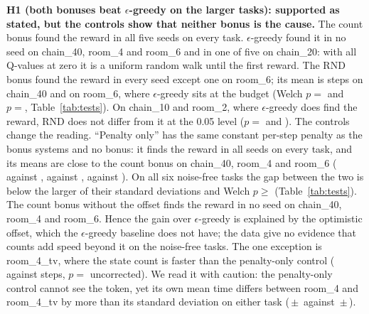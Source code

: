 \textbf{H1 (both bonuses beat $\epsilon$-greedy on the larger tasks): supported as stated, but the controls show that neither bonus is the cause.} The count bonus found the reward in all five seeds on every task. $\epsilon$-greedy found it in no seed on chain\_40, room\_4 and room\_6 and in one of five on chain\_20: with all Q-values at zero it is a uniform random walk until the first reward. The RND bonus found the reward in every seed except one on room\_6; its mean is  steps on chain\_40 and  on room\_6, where $\epsilon$-greedy sits at the budget (Welch $p={}$ and $p={}$, Table~\ref{tab:tests}). On chain\_10 and room\_2, where $\epsilon$-greedy does find the reward, RND does not differ from it at the 0.05 level ($p={}$ and ). The controls change the reading. ``Penalty only'' has the same constant per-step penalty as the bonus systems and no bonus: it finds the reward in all seeds on every task, and its means are close to the count bonus on chain\_40, room\_4 and room\_6 ( against ,  against ,  against ). On all six noise-free tasks the gap between the two is below the larger of their standard deviations and Welch $p\geq{}$ (Table~\ref{tab:tests}). The count bonus without the offset finds the reward in no seed on chain\_40, room\_4 and room\_6. Hence the gain over $\epsilon$-greedy is explained by the optimistic offset, which the $\epsilon$-greedy baseline does not have; the data give no evidence that counts add speed beyond it on the noise-free tasks. The one exception is room\_4\_tv, where the state count is faster than the penalty-only control ( against  steps, $p={}$ uncorrected). We read it with caution: the penalty-only control cannot see the token, yet its own mean time differs between room\_4 and room\_4\_tv by more than its standard deviation on either task (\,$\pm$\, against \,$\pm$\,).

